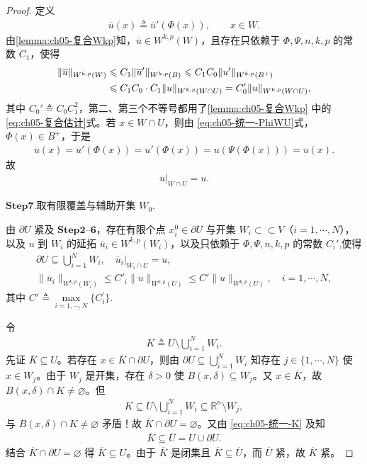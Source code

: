 \documentclass[../../main.tex]{subfiles}
\begin{document}
\begin{proof}
定义
\begin{align*}
\overline{u}(x)\triangleq\overline{u}'(\Phi(x)),\qquad x\in W.
\end{align*}
由\cref{lemma:ch05-复合Wkp}知，$\overline{u}\in W^{k,p}(W)$，且存在只依赖于 $\Phi,\Psi,n,k,p$ 的常数 $C_1$，使得
\begin{align}
\|\overline{u}\|_{W^{k,p}(W)}
&\leqslant C_1\|\overline{u}'\|_{W^{k,p}(B)}
\leqslant C_1C_0\|u'\|_{W^{k,p}(B^{+})}
\notag\\
&\leqslant C_1C_0\cdot C_1\|u\|_{W^{k,p}(W\cap U)}
=C_0'\|u\|_{W^{k,p}(W\cap U)},
\label{eq:ch05-统一-局部估计}
\end{align}
其中 $C_0'\triangleq C_0C_1^{2}$，第二、第三个不等号都用了\cref{lemma:ch05-复合Wkp} 中的\eqref{eq:ch05-复合估计}式。若 $x\in W\cap U$，则由 \eqref{eq:ch05-统一-PhiWU}式，$\Phi(x)\in B^{+}$，于是
\begin{align*}
\overline{u}(x)=\overline{u}'(\Phi(x))=u'(\Phi(x))=u(\Psi(\Phi(x)))=u(x).
\end{align*}
故
\begin{align}
\overline{u}|_{W\cap U}=u.
\label{eq:ch05-统一-局部等于u}
\end{align}

\noindent$\mathbf{Step}\bm{7}$.{\heiti 取有限覆盖与辅助开集 $W_0$.}

由 $\partial U$ 紧及 $\mathbf{Step}\bm{2}$--$\bm{6}$，存在有限个点 $x_i^{0}\in\partial U$ 与开集 $W_i\subset\subset V$（$i=1,\cdots,N$），以及 $u$ 到 $W_i$ 的延拓 $\overline{u}_i\in W^{k,p}(W_i)$，以及只依赖于 $\Phi,\Psi,n,k,p$ 的常数 $C_i'$,使得
\begin{gather}
\partial U\subseteq\bigcup_{i=1}^{N}W_i,\quad \overline{u}_i|_{W_i\cap U}=u,\nonumber\\
\|\overline{u}_i\|_{W^{k,p}(W_i)}\leqslant C'_i\|u\|_{W^{k,p}(U)}\leqslant C'\|u\|_{W^{k,p}(U)},\quad i=1,\cdots,N,\label{eq:ch05-统一-覆盖估计}
\end{gather}
其中 $C'\triangleq \underset{i=1,\cdots ,N}{\max}\{C_{i}^{\prime}\}$.

令
\begin{align}
K\triangleq U\setminus\bigcup_{i=1}^{N}W_i.
\label{eq:ch05-统一-K}
\end{align}
先证 $\overline{K}\subseteq U$。若存在 $x\in\overline{K}\cap\partial U$，则由 $\partial U\subseteq\bigcup_{i=1}^{N}W_i$ 知存在 $j\in\{1,\cdots,N\}$ 使 $x\in W_j$。由于 $W_j$ 是开集，存在 $\delta>0$ 使 $B(x,\delta)\subseteq W_j$。又 $x\in\overline{K}$，故 $B(x,\delta)\cap K\neq\varnothing$。但
\begin{align*}
K\subseteq U\setminus\bigcup_{i=1}^{N}W_i\subseteq\mathbb{R}^{n}\setminus W_j,
\end{align*}
与 $B(x,\delta)\cap K\neq\varnothing$ 矛盾！故 $\overline{K}\cap\partial U=\varnothing$。又由 \eqref{eq:ch05-统一-K} 及知
\begin{align*}
\overline{K}\subseteq\overline{U}=U\cup\partial U.
\end{align*}
结合 $\overline{K}\cap\partial U=\varnothing$ 得 $\overline{K}\subseteq U$。由于 $\overline{K}$ 是闭集且 $\overline{K}\subseteq\overline{U}$，而 $\overline{U}$ 紧，故 $\overline{K}$ 紧。


\end{proof}
\end{document}
